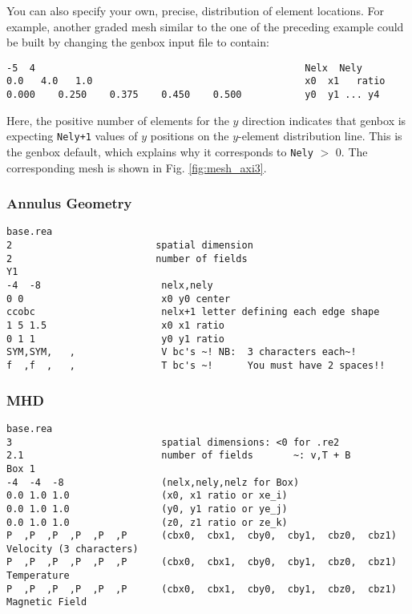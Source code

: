 You can also specify your own, precise, distribution of element
locations.   For example, another graded mesh similar to the
one of the preceding example could be built by changing the
genbox input file to contain:


\begin{verbatim}
-5  4                                               Nelx  Nely
0.0   4.0   1.0                                     x0  x1   ratio
0.000    0.250    0.375    0.450    0.500           y0  y1 ... y4
\end{verbatim}

\noindent
Here, the positive number of elements for the \(y\) direction indicates
that genbox is expecting {\tt Nely+1} values of \(y\) positions on the
\(y\)-element distribution line.   This is the genbox default, which
explains why it corresponds to {\tt Nely} \(>\) 0.  The corresponding mesh
is shown in Fig. \ref{fig:mesh_axi3}.

\subsubsection{ Annulus Geometry }
\begin{verbatim}base.rea
2                         spatial dimension
2                         number of fields
Y1
-4  -8                     nelx,nely
0 0                        x0 y0 center
ccobc                      nelx+1 letter defining each edge shape
1 5 1.5                    x0 x1 ratio
0 1 1                      y0 y1 ratio
SYM,SYM,   ,               V bc's ~! NB:  3 characters each~! 
f  ,f  ,   ,               T bc's ~!      You must have 2 spaces!!
\end{verbatim}

\subsubsection{ MHD}
\begin{verbatim}base.rea
3                          spatial dimensions: <0 for .re2
2.1                        number of fields       ~: v,T + B
Box 1
-4  -4  -8                 (nelx,nely,nelz for Box)
0.0 1.0 1.0                (x0, x1 ratio or xe_i)
0.0 1.0 1.0                (y0, y1 ratio or ye_j)
0.0 1.0 1.0                (z0, z1 ratio or ze_k)
P  ,P  ,P  ,P  ,P  ,P      (cbx0,  cbx1,  cby0,  cby1,  cbz0,  cbz1)  Velocity (3 characters)
P  ,P  ,P  ,P  ,P  ,P      (cbx0,  cbx1,  cby0,  cby1,  cbz0,  cbz1)  Temperature
P  ,P  ,P  ,P  ,P  ,P      (cbx0,  cbx1,  cby0,  cby1,  cbz0,  cbz1)  Magnetic Field
\end{verbatim}

